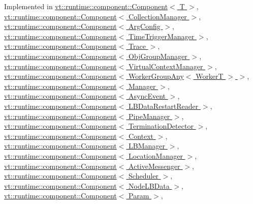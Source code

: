 Implemented in \hyperlink{structvt_1_1runtime_1_1component_1_1_component_adaf8bd995d4c91702e2ff7806ad9e695}{vt\+::runtime\+::component\+::\+Component$<$ T $>$}, \hyperlink{structvt_1_1runtime_1_1component_1_1_component_adaf8bd995d4c91702e2ff7806ad9e695}{vt\+::runtime\+::component\+::\+Component$<$ Collection\+Manager $>$}, \hyperlink{structvt_1_1runtime_1_1component_1_1_component_adaf8bd995d4c91702e2ff7806ad9e695}{vt\+::runtime\+::component\+::\+Component$<$ Arg\+Config $>$}, \hyperlink{structvt_1_1runtime_1_1component_1_1_component_adaf8bd995d4c91702e2ff7806ad9e695}{vt\+::runtime\+::component\+::\+Component$<$ Time\+Trigger\+Manager $>$}, \hyperlink{structvt_1_1runtime_1_1component_1_1_component_adaf8bd995d4c91702e2ff7806ad9e695}{vt\+::runtime\+::component\+::\+Component$<$ Trace $>$}, \hyperlink{structvt_1_1runtime_1_1component_1_1_component_adaf8bd995d4c91702e2ff7806ad9e695}{vt\+::runtime\+::component\+::\+Component$<$ Obj\+Group\+Manager $>$}, \hyperlink{structvt_1_1runtime_1_1component_1_1_component_adaf8bd995d4c91702e2ff7806ad9e695}{vt\+::runtime\+::component\+::\+Component$<$ Virtual\+Context\+Manager $>$}, \hyperlink{structvt_1_1runtime_1_1component_1_1_component_adaf8bd995d4c91702e2ff7806ad9e695}{vt\+::runtime\+::component\+::\+Component$<$ Worker\+Group\+Any$<$ Worker\+T $>$ $>$}, \hyperlink{structvt_1_1runtime_1_1component_1_1_component_adaf8bd995d4c91702e2ff7806ad9e695}{vt\+::runtime\+::component\+::\+Component$<$ Manager $>$}, \hyperlink{structvt_1_1runtime_1_1component_1_1_component_adaf8bd995d4c91702e2ff7806ad9e695}{vt\+::runtime\+::component\+::\+Component$<$ Async\+Event $>$}, \hyperlink{structvt_1_1runtime_1_1component_1_1_component_adaf8bd995d4c91702e2ff7806ad9e695}{vt\+::runtime\+::component\+::\+Component$<$ L\+B\+Data\+Restart\+Reader $>$}, \hyperlink{structvt_1_1runtime_1_1component_1_1_component_adaf8bd995d4c91702e2ff7806ad9e695}{vt\+::runtime\+::component\+::\+Component$<$ Pipe\+Manager $>$}, \hyperlink{structvt_1_1runtime_1_1component_1_1_component_adaf8bd995d4c91702e2ff7806ad9e695}{vt\+::runtime\+::component\+::\+Component$<$ Termination\+Detector $>$}, \hyperlink{structvt_1_1runtime_1_1component_1_1_component_adaf8bd995d4c91702e2ff7806ad9e695}{vt\+::runtime\+::component\+::\+Component$<$ Context $>$}, \hyperlink{structvt_1_1runtime_1_1component_1_1_component_adaf8bd995d4c91702e2ff7806ad9e695}{vt\+::runtime\+::component\+::\+Component$<$ L\+B\+Manager $>$}, \hyperlink{structvt_1_1runtime_1_1component_1_1_component_adaf8bd995d4c91702e2ff7806ad9e695}{vt\+::runtime\+::component\+::\+Component$<$ Location\+Manager $>$}, \hyperlink{structvt_1_1runtime_1_1component_1_1_component_adaf8bd995d4c91702e2ff7806ad9e695}{vt\+::runtime\+::component\+::\+Component$<$ Active\+Messenger $>$}, \hyperlink{structvt_1_1runtime_1_1component_1_1_component_adaf8bd995d4c91702e2ff7806ad9e695}{vt\+::runtime\+::component\+::\+Component$<$ Scheduler $>$}, \hyperlink{structvt_1_1runtime_1_1component_1_1_component_adaf8bd995d4c91702e2ff7806ad9e695}{vt\+::runtime\+::component\+::\+Component$<$ Node\+L\+B\+Data $>$}, \hyperlink{structvt_1_1runtime_1_1component_1_1_component_adaf8bd995d4c91702e2ff7806ad9e695}{vt\+::runtime\+::component\+::\+Component$<$ Param $>$}, 